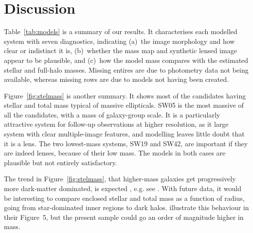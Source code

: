\section{Discussion}\label{sec:summary}

Table~\ref{tab:models} is a summary of our results.  It characterises
each modelled system with seven diagnostics, indicating (a)~the image
morphology and how clear or indistinct it is, (b)~whether the mass map
and synthetic lensed image appear to be plausible, and (c)~how the
model mass compares with the estimated stellar and full-halo masses.
Missing entires are due to photometry data not being available, whereas
missing rows are due to models not having been created.

Figure~\ref{fig:stelmass} is another summary.  It shows most of the
candidates having stellar and total mass typical of massive
ellipticals.  SW05 is the most massive of all the candidates, with a
mass of galaxy-group scale.  It is a particularly attractive system
for follow-up observations at higher resolution, as it large system
with clear multiple-image features, and modelling leaves little doubt
that it is a lens.  The two lowest-mass systems, SW19 and SW42, are
important if they are indeed lenses, because of their low mass.  The
models in both cases are plausible but not entirely satisfactory.

The trend in Figure~\ref{fig:stelmass}, that higher-mass galaxies get
progressively more dark-matter dominated, is expected
, e.g. see \cite{2005ApJ...623L...5F}.
With future data, it would be interesting to compare enclosed
stellar and total mass as a function of radius, going from
star-dominated inner regions to dark halos.
\cite{2011ApJ...740...97L} illustrate this behaviour in their
Figure~5, but the present sample could go an order of magnitude higher
in mass.

